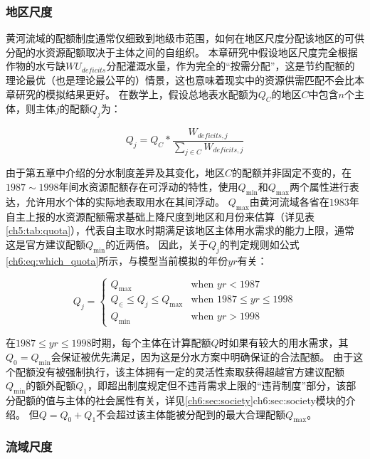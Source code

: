 \subsubsection*{地区尺度}

黄河流域的配额制度通常仅细致到地级市范围，如何在地区尺度分配该地区的可供分配的水资源配额取决于主体之间的自组织。
本章研究中假设地区尺度完全根据作物的水亏缺$WU_{deficits}$分配灌溉水量，作为完全的“按需分配”，这是节约配额的理论最优（也是理论最公平的）情景，这也意味着现实中的资源供需匹配不会比本章研究的模拟结果更好。
在数学上，假设总地表水配额为$Q_{C}$的地区$C$中包含$n$个主体，则主体$j$的配额$Q_j$为：

\begin{equation}
    \label{ch6:eq:quota}
    Q_j = Q_{C} * \frac{W_{deficits, j}}{\sum_{j \in C} W_{deficits, j}}
\end{equation}

由于第五章中介绍的分水制度差异及其变化，地区$C$的配额并非固定不变的，在$1987 \sim 1998$年间水资源配额存在可浮动的特性，使用$Q_{\min}$和$Q_{\max}$两个属性进行表达，允许用水个体的实际地表取用水在其间浮动。
$Q_{\max}$由黄河流域各省在$1983$年自主上报的水资源配额需求基础上降尺度到地区和月份来估算（详见表\ref{ch5:tab:quota}），代表自主取水时期满足该地区主体用水需求的能力上限，通常这是官方建议配额$Q_{\min}$的近两倍。
因此，关于$Q_j$的判定规则如公式\ref{ch6:eq:which_quota}所示，与模型当前模拟的年份$yr$有关：

\begin{equation}
    \label{ch6:eq:which_quota}
    Q_j =
    \begin{cases}
        Q_{\max} & \text{when } yr < 1987 \\
        Q_{\in} \leq Q_j \leq Q_{\max} & \text{when } 1987 \leq yr \leq 1998 \\
        Q_{\min} & \text{when } yr > 1998
    \end{cases}
\end{equation}

在$1987 \leq yr \leq 1998$时期，每个主体在计算配额$Q$时如果有较大的用水需求，其$Q_{0} = Q_{\min}$会保证被优先满足，因为这是分水方案中明确保证的合法配额。
由于这个配额没有被强制执行，该主体拥有一定的灵活性索取获得超越官方建议配额$Q_{\min}$的额外配额$Q_{1}$，即超出制度规定但不违背需求上限的“违背制度”部分，该部分配额的值与主体的社会属性有关，详见\ref{ch6:sec:society}\refname{ch6:sec:society}模块的介绍。
但$Q = Q_{0} + Q_{1}$不会超过该主体能被分配到的最大合理配额$Q_{\max}$。

\subsubsection*{流域尺度}

